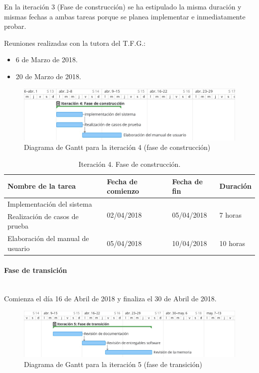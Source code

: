 \documentclass[twoside]{report}
\begin{document}
En la iteración 3 (Fase de construcción) se ha estipulado la misma duración y mismas fechas a ambas tareas porque se planea implementar e inmediatamente probar.

Reuniones realizadas con la tutora del T.F.G.:
\begin{itemize}
\item 6 de Marzo de 2018.
\item 20 de Marzo de 2018.
\end{itemize}


\begin{figure}[h]
\begin{center}
\includegraphics[width=\textwidth]{images/gantt/ite4}
\caption{Diagrama de Gantt para la iteración 4 (fase de construcción)}
\end{center}
\end{figure}

\begin{table}[H]
\centering
\begin{tabular}{|l|l|l|l|}
\hline
Nombre de la tarea                & Fecha de comienzo & Fecha de fin & Duración \\ \hline
Implementación del sistema        & \multirow{2}{*}{02/04/2018} & \multirow{2}{*}{05/04/2018}   & \multirow{2}{*}{7 horas}  \\
Realización de casos de prueba    & &   &   \\ \hline
Elaboración del manual de usuario & 05/04/2018        & 10/04/2018   & 10 horas   \\ \hline

\end{tabular}
\caption{Iteración 4. Fase de construcción.}
\end{table}

\paragraph{Fase de transición}\mbox{}\\

Comienza el día 16 de Abril de 2018 y finaliza el 30 de Abril de 2018.

\begin{figure}[h]
\begin{center}
\includegraphics[width=\textwidth]{images/gantt/ite5}
\caption{Diagrama de Gantt para la iteración 5 (fase de transición)}
\end{center}
\end{figure}
\end{document}
